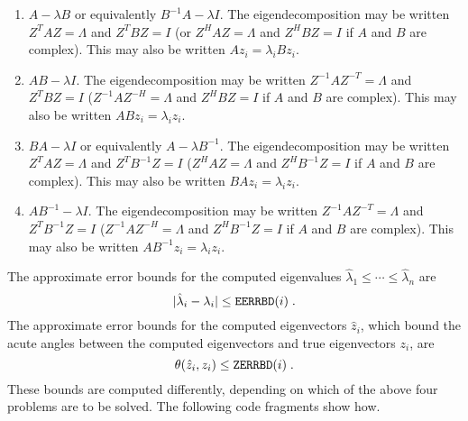 \begin{enumerate}
\item $A- \lambda B$ or equivalently $B^{-1} A - \lambda I$.
The eigendecomposition may be written $Z^T A Z = \Lambda$ and
$Z^T B Z = I$ (or $Z^H A Z = \Lambda$ and $Z^H B Z = I$
if $A$ and $B$ are complex).
This may also be written $Az_i = \lambda_i B z_i$.

\item $AB - \lambda I$.
The eigendecomposition may be written $Z^{-1} A Z^{-T} = \Lambda$ and
$Z^T B Z = I$ ($Z^{-1} A Z^{-H} = \Lambda$ and $Z^H B Z = I$ if $A$
and $B$ are complex).
This may also be written $ABz_i = \lambda_i z_i$.

\item $BA - \lambda I$ or equivalently $A - \lambda B^{-1}$.
The eigendecomposition may be written $Z^T A Z = \Lambda$
and $Z^T B^{-1} Z = I$ ($Z^H A Z = \Lambda$ and $Z^H B^{-1} Z = I$ if $A$
and $B$ are complex).
This may also be written $BAz_i = \lambda_i z_i$.

\item $A B^{-1} - \lambda I$.
The eigendecomposition may be written $Z^{-1} A Z^{-T} = \Lambda$
and $Z^T B^{-1} Z = I$ ($Z^{-1} A Z^{-H} = \Lambda$ and $Z^H B^{-1} Z = I$ if $A$
and $B$ are complex).
This may also be written $A B^{-1} z_i = \lambda_i z_i$.

\end{enumerate}

The approximate error bounds
for the computed eigenvalues $\hat{\lambda}_1 \leq \cdots \leq \hat{\lambda}_n$
are
\[
| \hat{\lambda}_i - \lambda_i | \leq {\tt EERRBD}(i) \; .
\]
The approximate error
bounds
for the computed eigenvectors $\hat{z}_i$,
which bound the acute angles between the computed eigenvectors and true
eigenvectors $z_i$, are
\[
\theta ( \hat{z}_i , z_i ) \leq {\tt ZERRBD}(i) \; .
\]
These bounds are computed differently, depending on which of the above four
problems are to be solved. The following code fragments show how.

